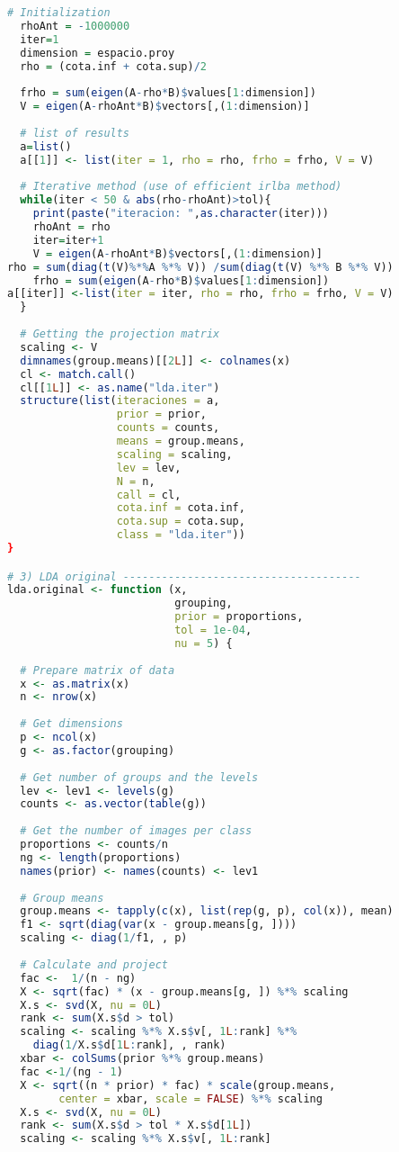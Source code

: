 \begin{lstlisting}[language=R, basicstyle=\small]
  # Initialization
  rhoAnt = -1000000
  iter=1
  dimension = espacio.proy
  rho = (cota.inf + cota.sup)/2
  
  frho = sum(eigen(A-rho*B)$values[1:dimension])
  V = eigen(A-rhoAnt*B)$vectors[,(1:dimension)]
  
  # list of results
  a=list()
  a[[1]] <- list(iter = 1, rho = rho, frho = frho, V = V) 
  
  # Iterative method (use of efficient irlba method)  
  while(iter < 50 & abs(rho-rhoAnt)>tol){
    print(paste("iteracion: ",as.character(iter)))
    rhoAnt = rho
    iter=iter+1  
    V = eigen(A-rhoAnt*B)$vectors[,(1:dimension)]
rho = sum(diag(t(V)%*%A %*% V)) /sum(diag(t(V) %*% B %*% V))
    frho = sum(eigen(A-rho*B)$values[1:dimension])
a[[iter]] <-list(iter = iter, rho = rho, frho = frho, V = V)
  }
  
  # Getting the projection matrix
  scaling <- V
  dimnames(group.means)[[2L]] <- colnames(x)
  cl <- match.call()
  cl[[1L]] <- as.name("lda.iter")
  structure(list(iteraciones = a, 
                 prior = prior, 
                 counts = counts, 
                 means = group.means, 
                 scaling = scaling, 
                 lev = lev, 
                 N = n, 
                 call = cl, 
                 cota.inf = cota.inf, 
                 cota.sup = cota.sup, 
                 class = "lda.iter"))
}

# 3) LDA original -------------------------------------
lda.original <- function (x, 
                          grouping, 
                          prior = proportions, 
                          tol = 1e-04, 
                          nu = 5) {
  
  # Prepare matrix of data
  x <- as.matrix(x)
  n <- nrow(x)
  
  # Get dimensions
  p <- ncol(x)
  g <- as.factor(grouping)
  
  # Get number of groups and the levels
  lev <- lev1 <- levels(g)
  counts <- as.vector(table(g))
  
  # Get the number of images per class
  proportions <- counts/n
  ng <- length(proportions)
  names(prior) <- names(counts) <- lev1
  
  # Group means 
  group.means <- tapply(c(x), list(rep(g, p), col(x)), mean)
  f1 <- sqrt(diag(var(x - group.means[g, ])))
  scaling <- diag(1/f1, , p)
  
  # Calculate and project
  fac <-  1/(n - ng)
  X <- sqrt(fac) * (x - group.means[g, ]) %*% scaling
  X.s <- svd(X, nu = 0L)
  rank <- sum(X.s$d > tol)
  scaling <- scaling %*% X.s$v[, 1L:rank] %*% 
    diag(1/X.s$d[1L:rank], , rank)
  xbar <- colSums(prior %*% group.means)
  fac <-1/(ng - 1)
  X <- sqrt((n * prior) * fac) * scale(group.means, 
        center = xbar, scale = FALSE) %*% scaling
  X.s <- svd(X, nu = 0L)
  rank <- sum(X.s$d > tol * X.s$d[1L])
  scaling <- scaling %*% X.s$v[, 1L:rank]
  

\end{lstlisting}
